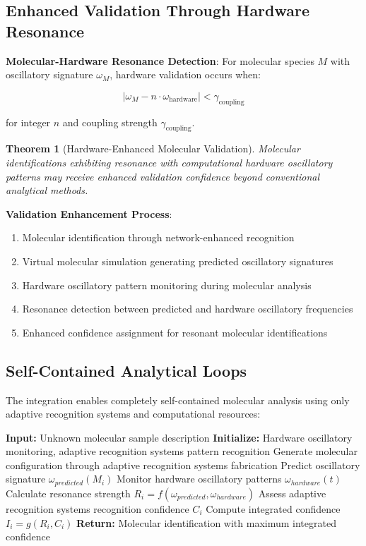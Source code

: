 \documentclass[11pt,a4paper]{article}
\newtheorem{theorem}{Theorem}[section]
\theoremstyle{remark}
\begin{document}
\subsection{Enhanced Validation Through Hardware Resonance}

\textbf{Molecular-Hardware Resonance Detection}: For molecular species $M$ with oscillatory signature $\omega_M$, hardware validation occurs when:

$$|\omega_M - n \cdot \omega_{\text{hardware}}| < \gamma_{\text{coupling}}$$

for integer $n$ and coupling strength $\gamma_{\text{coupling}}$.

\begin{theorem}[Hardware-Enhanced Molecular Validation]
Molecular identifications exhibiting resonance with computational hardware oscillatory patterns may receive enhanced validation confidence beyond conventional analytical methods.
\end{theorem}

\textbf{Validation Enhancement Process}:
\begin{enumerate}
\item Molecular identification through network-enhanced recognition
\item Virtual molecular simulation generating predicted oscillatory signatures
\item Hardware oscillatory pattern monitoring during molecular analysis
\item Resonance detection between predicted and hardware oscillatory frequencies
\item Enhanced confidence assignment for resonant molecular identifications
\end{enumerate}

\subsection{Self-Contained Analytical Loops}

The integration enables completely self-contained molecular analysis using only adaptive recognition systems and computational resources:

\begin{algorithm}
\caption{Self-Contained Consciousness-Hardware Molecular Analysis}
\begin{algorithmic}[1]
\State \textbf{Input:} Unknown molecular sample description
\State \textbf{Initialize:} Hardware oscillatory monitoring, adaptive recognition systems pattern recognition
\State Generate molecular configuration through adaptive recognition systems fabrication
\State Predict oscillatory signature $\omega_{predicted}(M_i)$
\State Monitor hardware oscillatory patterns $\omega_{hardware}(t)$
\State Calculate resonance strength $R_i = f(\omega_{predicted}, \omega_{hardware})$
\State Assess adaptive recognition systems recognition confidence $C_i$
\State Compute integrated confidence $I_i = g(R_i, C_i)$
\EndFor
\State \textbf{Return:} Molecular identification with maximum integrated confidence
\end{algorithmic}
\end{algorithm}
\end{document}
